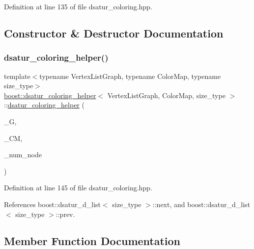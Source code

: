 Definition at line 135 of file dsatur\+\_\+coloring.\+hpp.



\subsection{Constructor \& Destructor Documentation}
\mbox{\label{classboost_1_1dsatur__coloring__helper_a052af556756ff5557d84fe999d33f182}} 
\subsubsection{\texorpdfstring{dsatur\+\_\+coloring\+\_\+helper()}{dsatur\_coloring\_helper()}}
{\footnotesize\ttfamily template$<$typename Vertex\+List\+Graph, typename Color\+Map, typename size\+\_\+type$>$ \\
\hyperlink{classboost_1_1dsatur__coloring__helper}{boost\+::dsatur\+\_\+coloring\+\_\+helper}$<$ Vertex\+List\+Graph, Color\+Map, size\+\_\+type $>$\+::\hyperlink{classboost_1_1dsatur__coloring__helper}{dsatur\+\_\+coloring\+\_\+helper} (\begin{DoxyParamCaption}\item[{const Vertex\+List\+Graph \&}]{\+\_\+G,  }\item[{Color\+Map \&}]{\+\_\+\+CM,  }\item[{const size\+\_\+type}]{\+\_\+num\+\_\+node }\end{DoxyParamCaption})\hspace{0.3cm}{\ttfamily [inline]}}



Definition at line 145 of file dsatur\+\_\+coloring.\+hpp.



References boost\+::dsatur\+\_\+d\+\_\+list$<$ size\+\_\+type $>$\+::next, and boost\+::dsatur\+\_\+d\+\_\+list$<$ size\+\_\+type $>$\+::prev.



\subsection{Member Function Documentation}
\mbox{\label{classboost_1_1dsatur__coloring__helper_a98b34621fd34aa9acf2ae7dcf1a54506}} 
